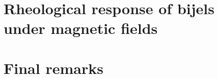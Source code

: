 \documentclass{udthesis}
\begin{document}
\chapter{Rheological response of bijels under magnetic fields}
\label{chapter:aim3}


\chapter{Final remarks}
\label{chapter:final_remarks}



% 




\end{document}
